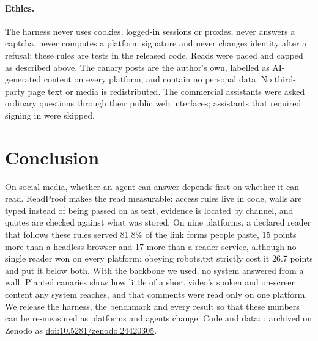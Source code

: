 \paragraph{Ethics.}
The harness never uses cookies, logged-in sessions or proxies, never answers a captcha, never computes a platform
signature and never changes identity after a refusal; these rules are tests in the released code. Reads were paced
and capped as described above. The canary posts are the author's own, labelled as AI-generated content on every
platform, and contain no personal data. No third-party page text or media is redistributed. The commercial assistants
were asked ordinary questions through their public web interfaces; assistants that required signing in were skipped.

\section{Conclusion}\label{sec:conclusion}

On social media, whether an agent can answer depends first on whether it can read. ReadProof makes the read
measurable: access rules live in code, walls are typed instead of being passed on as text, evidence is located by
channel, and quotes are checked against what was stored. On nine platforms, a declared reader that follows these
rules served 81.8\% of the link forms people paste, 15 points more than a headless browser and 17 more than a reader
service, although no single reader won on every platform; obeying robots.txt strictly cost it 26.7 points and put it
below both. With the backbone we used, no system answered from a wall. Planted canaries show how little of a short
video's spoken and on-screen content any system reaches, and that comments were read only on one platform. We release
the harness, the benchmark and every result so that these numbers can be re-measured as platforms and agents change.
Code and data: \RepoURL; archived on Zenodo as \href{https://doi.org/10.5281/zenodo.24420305}{doi:10.5281/zenodo.24420305}.
